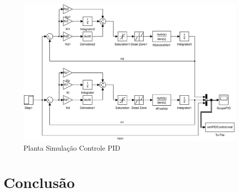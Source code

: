 \documentclass[a4paper,11pt]{article}
\begin{document}
\begin{figure}[H]
    \centering
    \includegraphics[width=1.0\linewidth]{tex/img/dcMotorControl.pdf}
    \caption{Planta Simulação Controle PID}
    \label{fig:pidControlPlant}
\end{figure}

\section{Conclusão}






\end{document}
